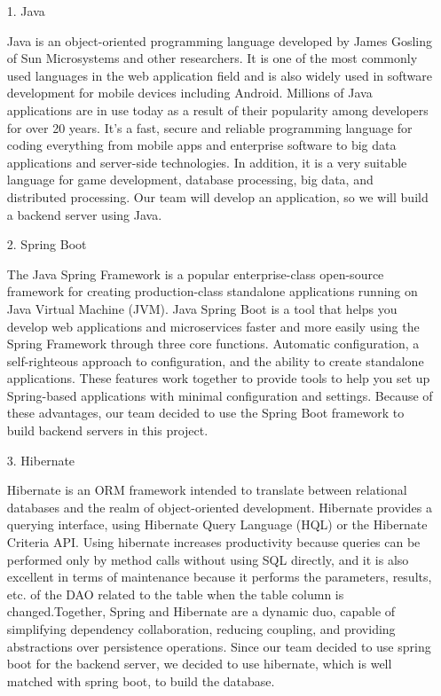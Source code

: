 \documentclass[conference]{IEEEtran}
\begin{document}
\begin{enumerate}
    \begin{enumerate}
        \item[1.]Java
        \item[]Java is an object-oriented programming language developed by James Gosling of Sun Microsystems and other researchers. It is one of the most commonly used languages in the web application field and is also widely used in software development for mobile devices including Android. Millions of Java applications are in use today as a result of their popularity among developers for over 20 years. It's a fast, secure and reliable programming language for coding everything from mobile apps and enterprise software to big data applications and server-side technologies. In addition, it is a very suitable language for game development, database processing, big data, and distributed processing. Our team will develop an application, so we will build a backend server using Java.\\

        \item[2.]Spring Boot 
        \item[]The Java Spring Framework is a popular enterprise-class open-source framework for creating production-class standalone applications running on Java Virtual Machine (JVM). Java Spring Boot is a tool that helps you develop web applications and microservices faster and more easily using the Spring Framework through three core functions. Automatic configuration, a self-righteous approach to configuration, and the ability to create standalone applications. These features work together to provide tools to help you set up Spring-based applications with minimal configuration and settings. Because of these advantages, our team decided to use the Spring Boot framework to build backend servers in this project.\\ 

        \item[3.]Hibernate \cite{fisher2010spring}
        \item[]Hibernate is an ORM framework intended to translate between relational databases and the realm of object-oriented development. Hibernate provides a querying interface, using Hibernate Query Language (HQL) or the Hibernate Criteria API. Using hibernate increases productivity because queries can be performed only by method calls without using SQL directly, and it is also excellent in terms of maintenance because it performs the parameters, results, etc. of the DAO related to the table when the table column is changed.Together, Spring and Hibernate are a dynamic duo, capable of simplifying dependency collaboration, reducing coupling, and providing abstractions over persistence operations. Since our team decided to use spring boot for the backend server, we decided to use hibernate, which is well matched with spring boot, to build the database.\\


\end{enumerate}
\end{enumerate}
\end{document}
